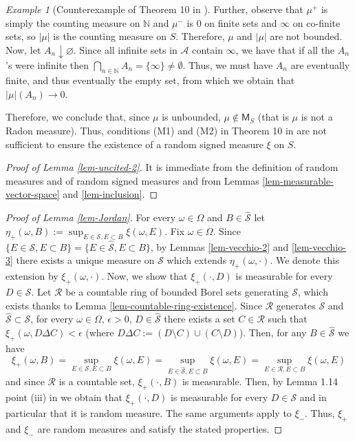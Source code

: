 \documentclass{article}
\theoremstyle{plain}
\theoremstyle{remark}
\newtheorem*{example}{Example}
\begin{document}
\begin{example}[Counterexample of Theorem 10 in \cite{Jacob1995}]
	Further, observe that $\mu^+$ is simply the counting measure on $\mathbb{N}$ and $\mu^-$ is $0$ on finite sets and $\infty$ on co-finite sets, so $|\mu|$ is the counting measure on $S$. Therefore, $\mu$ and $|\mu|$ are not bounded. Now, let $A_n \downarrow \varnothing$. Since all infinite sets in $\mathcal{A}$ contain $\infty$, we have that if all the $A_n$'s were infinite then $\bigcap_{n\in\mathbb{N}} A_n=\{\infty\}\neq\emptyset$. Thus, we must have $A_n$ are eventually finite, and thus eventually the empty set, from which we obtain that $|\mu|(A_n) \to 0$.
	
	Therefore, we conclude that, since $\mu$ is unbounded, $\mu\notin\mathsf{M}_S$ (that is $\mu$ is not a Radon measure). Thus, conditions (M1) and (M2) in Theorem 10 in \cite{Jacob1995} are not sufficient to ensure the existence of a random signed measure $\xi$ on $S$.
\end{example}

\begin{proof}[Proof of Lemma \ref{lem-uncited-2}]
	It is immediate from the definition of random measures and of random signed measures and from Lemmas \ref{lem-measurable-vector-space} and \ref{lem-inclusion}.
\end{proof}


\begin{proof}[Proof of Lemma \ref{lem-Jordan}]
	For every $\omega\in\Omega$ and $B\in\hat{\mathcal{S}}$ let $		\eta_+(\omega,B):=\sup_{E\in \mathcal{S}, E\subset B}\xi(\omega,E)$. Fix $\omega\in\Omega$. Since $\{E\in \mathcal{S}, E\subset B\}=\{E\in \hat{\mathcal{S}}, E\subset B\}$, by Lemmas \ref{lem-vecchio-2} and \ref{lem-vecchio-3} there exists a unique measure on $\mathcal{S}$ which extends $\eta_+(\omega,\cdot)$. We denote this extension by $\xi_+(\omega,\cdot)$. Now, we show that $\xi_+(\cdot,D)$ is measurable for every $D\in \mathcal{S}$. Let $\mathcal{R}$ be a countable ring of bounded Borel sets generating $ \mathcal{S}$, which exists thanks to Lemma \ref{lem-countable-ring-existence}. Since $\mathcal{R}$ generates $\mathcal{S}$ and $\hat{\mathcal{S}}\subset\mathcal{S}$, for every $\omega\in\Omega$, $\epsilon>0$, $D\in\hat{\mathcal{S}}$ there exists a set $C\in\mathcal{R}$ such that $\xi_+(\omega,D\Delta C)<\epsilon$ (where $D\Delta C:=(D\setminus C)\cup(C\setminus D)$). Then, for any $B\in\hat{\mathcal{S}}$ we have
	\begin{equation*}
		\xi_+(\omega,B)=\sup_{E\in \mathcal{S}, E\subset B}\xi(\omega,E)= \sup_{E\in \hat{\mathcal{S}}, E\subset B}\xi(\omega,E)=\sup_{E\in \mathcal{R}, E\subset B}\xi(\omega,E)
	\end{equation*}
	and since $\mathcal{R}$ is a countable set, $\xi_+(\cdot,B)$ is measurable. Then,  by Lemma 1.14 point (iii) in \cite{Kallenberg2} we obtain that $\xi_+(\cdot,D)$ is measurable for every $D\in \mathcal{S}$ and in particular that it is random measure. The same arguments apply to $\xi_-$. Thus, $\xi_+$ and $\xi_-$ are random measures and satisfy the stated properties.
\end{proof}
\end{document}
